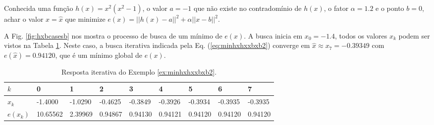 \begin{example}\label{ex:minhxhxxbxb2}
Conhecida uma função $h(x)=x^2(x^2-1)$, o valor $a=-1$ que não existe no contradomínio de $h(x)$,
o fator $\alpha=1.2$ e o ponto $b=0$,
achar o valor $x=\hat{x}$ que minimize $e(x)=||h(x)-a||^2+\alpha||x-b||^2$.
\end{example}
\begin{SolutionT}\label{sol:minhxhxxbxb2}
 A Fig. \ref{fig:hxbcasesb} nos mostra o processo de busca de um mínimo
 de $e(x)$. A busca inicia em $x_0=-1.4$,
 todos os valores $x_{k}$ podem ser vistos na 
Tabela \ref{tab:hxbcases2}. Neste caso, a busca iterativa indicada pela Eq. (\ref{eq:minhxhxxbxb2}) converge
em $\hat{x}\approx x_7=-0.39349$ com $e(\hat{x})=0.94120$, que é um mínimo global de $e(x)$.

\end{SolutionT}

\begin{table}[!h]
\centering
\begin{tabular}{|l|l|l|l|l|l|l|l|l|}
\hline
$k$      & 0 & 1 & 2 & 3 & 4 & 5 & 6 & 7 \\ \hline
$x_k$    & -1.4000 & -1.0290 & -0.4625 & -0.3849 & -0.3926 & -0.3934 & -0.3935 & -0.3935 \\ \hline
$e(x_k)$ & 10.65562 &  2.39969 &  0.94867 &  0.94130 &  0.94121 &  0.94120 &  0.94120 &  0.94120 \\ \hline
\end{tabular}
\caption{Resposta iterativa do Exemplo \ref{ex:minhxhxxbxb2}.}
\label{tab:hxbcases2}
\end{table}


